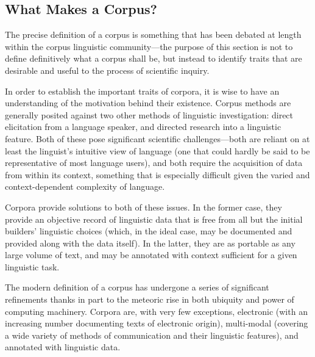 \subsection{What Makes a Corpus?} %

The precise definition of a corpus is something that has been debated at length within the corpus linguistic community---the purpose of this section is not to define definitively what a corpus shall be, but instead to identify traits that are desirable and useful to the process of scientific inquiry.



In order to establish the important traits of corpora, it is wise to have an understanding of the motivation behind their existence.  Corpus methods are generally posited against two other methods of linguistic investigation: direct elicitation from a language speaker, and directed research into a linguistic feature.  Both of these pose significant scientific challenges---both are reliant on at least the linguist's intuitive view of language (one that could hardly be said to be representative of most language users), and both require the acquisition of data from within its context, something that is especially difficult given the varied and context-dependent complexity of language.

Corpora provide solutions to both of these issues.  In the former case, they provide an objective record of linguistic data that is free from all but the initial builders' linguistic choices (which, in the ideal case, may be documented and provided along with the data itself).  In the latter, they are as portable as any large volume of text, and may be annotated with context sufficient for a given linguistic task.


The modern definition of a corpus has undergone a series of significant refinements thanks in part to the meteoric rise in both ubiquity and power of computing machinery.  Corpora are, with very few exceptions, electronic (with an increasing number documenting texts of electronic origin), multi-modal (covering a wide variety of methods of communication and their linguistic features), and annotated with linguistic data.  

